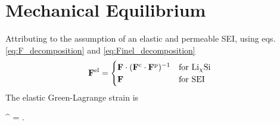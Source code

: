\section{Mechanical Equilibrium } \label{section:MechEqbm}

Attributing to the assumption of an elastic and permeable SEI, using eqs. \ref{eq:F_decomposition}  and \ref{eq:Finel_decomposition}
\begin{align}
    \mathbf{F}^{{\rm{el}}} &=  \begin{cases}
        \mathbf{F} \cdot (\mathbf{F}^{{\rm{c}}} \cdot \mathbf{F}^{{\rm{p}}})^{-1} & \text{for Li$_\chi$Si } \\
        \mathbf{F} & \text{for SEI}
    \end{cases} \label{eq:Fel_tensor}
\end{align}
The elastic Green-Lagrange strain is
\begin{nonumbereq}
\E^{\el} =  \left[ (\F^\el)^\T \cdot  \F^\el - \I \right].
\end{nonumbereq}

